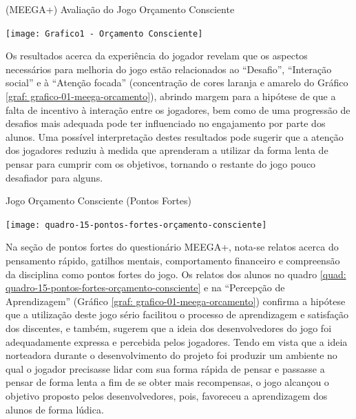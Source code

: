 \graphicspath{{graficos/}} 
\begin{grafico}[!ht]
\centering
\caption{(MEEGA+) Avaliação do Jogo Orçamento Consciente}
\centering
\texttt{[image: Grafico1 - Orçamento Consciente]}
\label{graf: grafico-01-meega-orcamento}
\end{grafico}

Os resultados acerca da experiência do jogador revelam que os aspectos necessários para melhoria do jogo estão relacionados ao “Desafio”, “Interação social” e à “Atenção focada” (concentração de cores laranja e amarelo do Gráfico \ref{graf: grafico-01-meega-orcamento}), abrindo margem para a hipótese de que a falta de incentivo à interação entre os jogadores, bem como de uma progressão de desafios mais adequada pode ter influenciado no engajamento por parte dos alunos. Uma possível interpretação destes resultados pode sugerir que a atenção dos jogadores reduziu à medida que aprenderam a utilizar da forma lenta de pensar para cumprir com os objetivos, tornando o restante do jogo pouco desafiador para alguns.

\graphicspath{{quadros/}} 
\begin{quadro}[!ht]
\centering
\begin{minipage}{1.\textwidth}
\caption{Jogo Orçamento Consciente (Pontos Fortes)}
\centering
\texttt{[image: quadro-15-pontos-fortes-orçamento-consciente]}
\label{quad: quadro-15-pontos-fortes-orçamento-consciente}
\end{minipage}
\end{quadro}  

Na seção de pontos fortes do questionário MEEGA+, nota-se relatos acerca do pensamento rápido, gatilhos mentais, comportamento financeiro e compreensão da disciplina como pontos fortes do jogo. Os relatos dos alunos no quadro \ref{quad: quadro-15-pontos-fortes-orçamento-consciente} e na “Percepção de Aprendizagem” (Gráfico \ref{graf: grafico-01-meega-orcamento}) confirma a hipótese que a utilização deste jogo sério facilitou o processo de aprendizagem e satisfação dos discentes, e também, sugerem que a ideia dos desenvolvedores do jogo foi adequadamente expressa e percebida pelos jogadores. Tendo em vista que a ideia norteadora durante o desenvolvimento do projeto foi produzir um ambiente no qual o jogador precisasse lidar com sua forma rápida de pensar e passasse a pensar de forma lenta a fim de se obter mais recompensas, o jogo alcançou o objetivo proposto pelos desenvolvedores, pois, favoreceu a aprendizagem dos alunos de forma lúdica.


